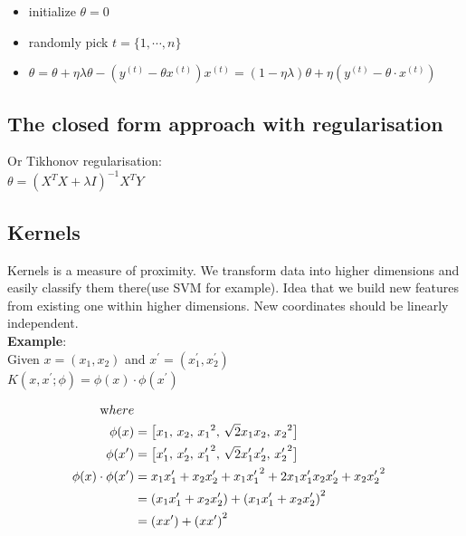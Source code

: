 \begin{itemize}
\item initialize $\theta=0$
\item randomly pick $t=\{1,\cdots,n\}$
\item $\theta = \theta + \eta\lambda \theta - (y^{(t)}-\theta x^{(t)})x^{(t)} = (1-\eta \lambda)\theta + \eta(y^{(t)}-\theta \cdot x^{(t)})$
\end{itemize} 


\subsection{The closed form approach with regularisation}
Or Tikhonov regularisation:\\
$\theta = (X^T X + \lambda I)^{-1} X^T Y$



\subsection{Kernels}

Kernels is a measure of proximity. We transform data into higher dimensions and easily classify
them there(use SVM for example). Idea that we build new features from existing one within higher dimensions.
New coordinates should be linearly independent.\\

\textbf{Example}:\\
Given $x=(x_1, x_2)$ and $x^\prime =(x_1^\prime , x_2^\prime )$\\
$K(x, x^\prime ; \phi) = \phi(x) \cdot \phi( x^\prime)$ \

\begin{align*}
\text where \\
\displaystyle  \phi (x) \displaystyle &= \big [x_1, \, x_2,\,  {x_1}^2,\,  \sqrt{2}x_1x_2,\,  {x_2}^2 \big ]\\
\displaystyle \phi (x') \displaystyle &= \big [x_1^\prime ,\,  x_2^\prime ,\,  {x_1^\prime }^2,\,  \sqrt{2}x_1^\prime x_2^\prime ,\,  {x_2^\prime }^2 \big ]\\
\displaystyle  \phi (x) \cdot \phi (x^\prime )&=\displaystyle {x_1}{x_1^\prime } + {x_2}{x_2^\prime } + {x_1x_1^\prime }^2 + 2{x_1}{x_1^\prime }{x_2}{x_2^\prime } + {x_2x_2^\prime }^2\\
&=\displaystyle \left({x_1}{x_1^\prime } + {x_2}{x_2^\prime }\right)+ \left({x_1}{x_1^\prime } + {x_2}{x_2^\prime }\right)^2\\
&=\displaystyle \left({x}{x^\prime }\right)+ \left({x}{x^\prime }\right)^2
\end{align*}



